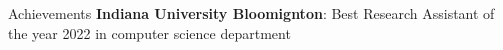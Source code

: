 
\begin{rubric}{Achievements}
\entry*[Apr 2023] \textbf{Indiana University Bloomignton}:
Best Research Assistant of the year 2022 in computer science department
\end{rubric}